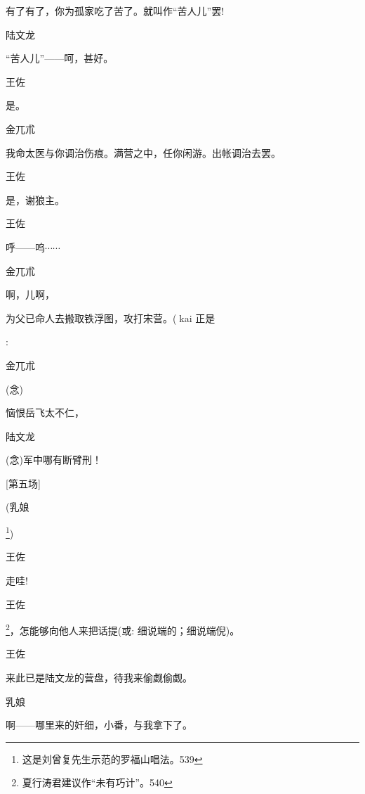 {{{{有了有了，你为孤家吃了苦了。就叫作``苦人儿''罢!}

{陆文龙\hspace{20pt}~

``苦人儿''------呵，甚好。}

{王佐\hspace{30pt}~

是。}

{金兀朮\hspace{20pt}~

我命太医与你调治伤痕。满营之中，任你闲游。出帐调治去罢。}

{王佐\hspace{30pt}~

是，谢狼主。}

{王佐\hspace{30pt}~

呼------呜$\cdots{}\cdots{}$}

{金兀朮\hspace{20pt}~

啊，儿啊，}为父已命人去搬取铁浮图，攻打宋营。(kai 正是}: 

{金兀朮\hspace{20pt}~

({\akai 念})}恼恨岳飞太不仁，

陆文龙\hspace{20pt}~

{({\akai 念})}军中哪有断臂刑！

{[}第五场{]}

{(乳娘

\footnote{ 这是刘曾复先生示范的罗福山唱法。{539}}{)} }

{王佐\hspace{30pt}~

走哇!}

{王佐

\footnote{ 夏行涛君建议作``未有巧计''。{540}}{，怎能够向他人来把话提({\akai 或}: 细说端的；细说端倪)。} }

{王佐\hspace{30pt}~

来此已是陆文龙的营盘，待我来偷觑偷觑。}

{乳娘\hspace{30pt}~

啊------哪里来的奸细，小番，与我拿下了。}

}}
